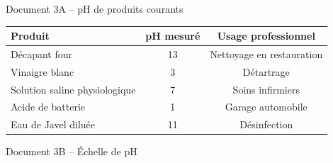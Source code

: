\documentclass[12pt,a4paper]{article}
\begin{document}
\begin{docbox}{Document 3A -- pH de produits courants}
\renewcommand{\arraystretch}{1.4}
\begin{center}
\begin{tabular}{|l|c|c|}
\hline
\textbf{Produit} & \textbf{pH mesur\'e} & \textbf{Usage professionnel} \\
\hline
D\'ecapant four & 13 & Nettoyage en restauration \\
Vinaigre blanc & 3 & D\'etartrage \\
Solution saline physiologique & 7 & Soins infirmiers \\
Acide de batterie & 1 & Garage automobile \\
Eau de Javel dilu\'ee & 11 & D\'esinfection \\
\hline
\end{tabular}
\end{center}
\end{docbox}

\vspace{2mm}

\begin{docbox}{Document 3B -- \'Echelle de pH}
\vspace{2mm}
\begin{center}
\end{center}
\vspace{1mm}
\end{docbox}

\vspace{2mm}
\end{document}
